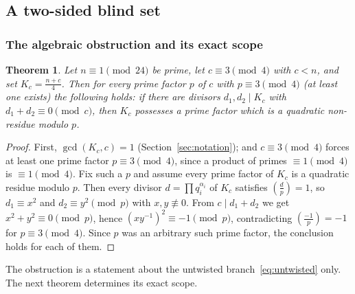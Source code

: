 \documentclass[11pt, a4paper]{article}
\theoremstyle{plain}
\newtheorem{theorem}{Theorem}[section]
\theoremstyle{definition}
\newcommand{\leg}[2]{\left(\frac{#1}{#2}\right)}
\begin{document}
\subsection{A two-sided blind set} \label{sec:5.1}

\subsubsection{The algebraic obstruction and its exact scope}

\begin{theorem} \label{thm:algebraic_obstruction}
Let $n \equiv 1 \pmod{24}$ be prime, let $c \equiv 3 \pmod 4$ with $c<n$, and set $K_c = \frac{n+c}{4}$. Then for \emph{every} prime factor $p$ of $c$ with $p \equiv 3 \pmod{4}$ (at least one exists) the following holds: if there are divisors $d_1, d_2 \mid K_c$ with $d_1+d_2 \equiv 0 \pmod c$, then $K_c$ possesses a prime factor which is a quadratic non-residue modulo $p$.
\end{theorem}
\begin{proof}
First, $\gcd(K_c,c)=1$ (Section~\ref{sec:notation}); and $c\equiv3\pmod4$ forces at least one prime factor $p\equiv3\pmod4$, since a product of primes $\equiv1\pmod4$ is $\equiv1\pmod4$. Fix such a $p$ and assume every prime factor of $K_c$ is a quadratic residue modulo $p$. Then every divisor $d=\prod q_i^{\alpha_i}$ of $K_c$ satisfies $\leg dp=1$, so $d_1\equiv x^{2}$ and $d_2\equiv y^{2}\pmod p$ with $x,y\not\equiv0$. From $c\mid d_1+d_2$ we get $x^{2}+y^{2}\equiv0\pmod p$, hence $(xy^{-1})^{2}\equiv-1\pmod p$, contradicting $\leg{-1}p=-1$ for $p\equiv3\pmod4$. Since $p$ was an arbitrary such prime factor, the conclusion holds for each of them.
\end{proof}

The obstruction is a statement about the untwisted branch~\eqref{eq:untwisted} only. The next theorem determines its exact scope.
\end{document}
